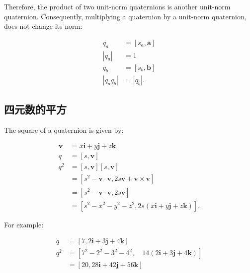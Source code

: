 Therefore, the product of two unit-norm quaternions is another unit-norm quaternion. Consequently, multiplying a quaternion by a unit-norm quaternion, does not change its norm:

$$
    \begin{aligned}
        q_{a}                    & =\left[s_{a}, \mathbf{a}\right] \\
        \left|q_{a}\right|       & =1                              \\
        q_{b}                    & =\left[s_{b}, \mathbf{b}\right] \\
        \left|q_{a} q_{b}\right| & =\left|q_{b}\right| .
    \end{aligned}
$$

\subsection{四元数的平方}
The square of a quaternion is given by:

$$
    \begin{aligned}
        \mathbf{v} & =x \mathbf{i}+y \mathbf{j}+z \mathbf{k}                                                      \\
        q          & =[s, \mathbf{v}]                                                                             \\
        q^{2}      & =[s, \mathbf{v}][s, \mathbf{v}]                                                              \\
                   & =\left[s^{2}-\mathbf{v} \cdot \mathbf{v}, 2 s \mathbf{v}+\mathbf{v} \times \mathbf{v}\right] \\
                   & =\left[s^{2}-\mathbf{v} \cdot \mathbf{v}, 2 s \mathbf{v}\right]                              \\
                   & =\left[s^{2}-x^{2}-y^{2}-z^{2}, 2 s(x \mathbf{i}+y \mathbf{j}+z \mathbf{k})\right] .
    \end{aligned}
$$

For example:

$$
    \begin{aligned}
        q     & =[7,2 \mathbf{i}+3 \mathbf{j}+4 \mathbf{k}]                                             \\
        q^{2} & =\left[7^{2}-2^{2}-3^{2}-4^{2}, \quad 14(2 \mathbf{i}+3 \mathbf{j}+4 \mathbf{k})\right] \\
              & =[20,28 \mathbf{i}+42 \mathbf{j}+56 \mathbf{k}]
    \end{aligned}
$$

